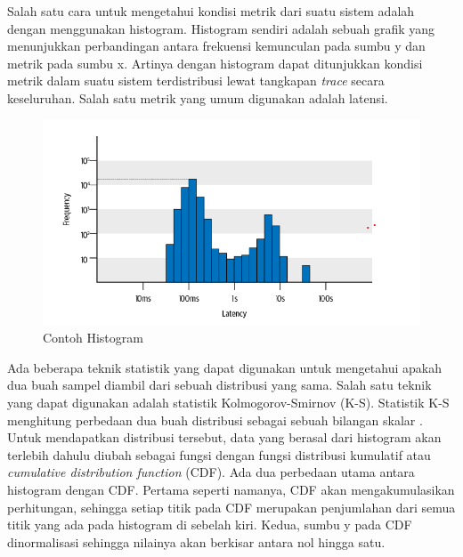 Salah satu cara untuk mengetahui kondisi metrik dari suatu sistem adalah dengan menggunakan histogram. Histogram sendiri adalah sebuah grafik yang menunjukkan perbandingan antara frekuensi kemunculan pada sumbu y dan metrik pada sumbu x. Artinya dengan histogram dapat ditunjukkan kondisi metrik dalam suatu sistem terdistribusi lewat tangkapan \textit{trace} secara keseluruhan. Salah satu metrik yang umum digunakan adalah latensi.
\begin{figure}[htb]
	\centering
	\includegraphics[width=1\textwidth]{resources/ch2/histogram-og.png}
	\caption{Contoh Histogram \citep{parker2020distributed}}
	\label{histogram}
\end{figure}

Ada beberapa teknik statistik yang dapat digunakan untuk mengetahui apakah dua buah sampel diambil dari sebuah distribusi yang sama. Salah satu teknik yang dapat digunakan adalah statistik Kolmogorov-Smirnov (K-S). Statistik K-S menghitung perbedaan dua buah distribusi sebagai sebuah bilangan skalar \citep{kolmogorov_1951}. Untuk mendapatkan distribusi tersebut, data yang berasal dari histogram akan terlebih dahulu diubah sebagai fungsi dengan fungsi distribusi kumulatif atau \textit{cumulative distribution function} (CDF). Ada dua perbedaan utama antara histogram dengan CDF. Pertama seperti namanya, CDF akan mengakumulasikan perhitungan, sehingga setiap titik pada CDF merupakan penjumlahan dari semua titik yang ada pada histogram di sebelah kiri. Kedua, sumbu y pada CDF dinormalisasi sehingga nilainya akan berkisar antara nol hingga satu. 

